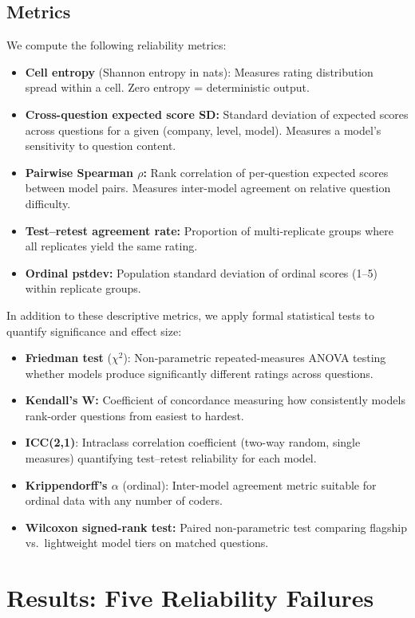 \documentclass{article}
\begin{document}
\subsection{Metrics}
We compute the following reliability metrics:
\begin{itemize}
  \item \textbf{Cell entropy} (Shannon entropy in nats): Measures rating distribution spread within a cell. Zero entropy = deterministic output.
  \item \textbf{Cross-question expected score SD:} Standard deviation of expected scores across questions for a given (company, level, model). Measures a model's sensitivity to question content.
  \item \textbf{Pairwise Spearman $\rho$:} Rank correlation of per-question expected scores between model pairs. Measures inter-model agreement on relative question difficulty.
  \item \textbf{Test--retest agreement rate:} Proportion of multi-replicate groups where all replicates yield the same rating.
  \item \textbf{Ordinal pstdev:} Population standard deviation of ordinal scores (1--5) within replicate groups.
\end{itemize}

In addition to these descriptive metrics, we apply formal statistical tests to quantify significance and effect size:
\begin{itemize}
  \item \textbf{Friedman test} ($\chi^2$): Non-parametric repeated-measures ANOVA testing whether models produce significantly different ratings across questions.
  \item \textbf{Kendall's W:} Coefficient of concordance measuring how consistently models rank-order questions from easiest to hardest.
  \item \textbf{ICC(2,1)}: Intraclass correlation coefficient (two-way random, single measures) quantifying test--retest reliability for each model.
  \item \textbf{Krippendorff's $\alpha$} (ordinal): Inter-model agreement metric suitable for ordinal data with any number of coders.
  \item \textbf{Wilcoxon signed-rank test:} Paired non-parametric test comparing flagship vs.\ lightweight model tiers on matched questions.
\end{itemize}

\section{Results: Five Reliability Failures}\label{sec:results}
\end{document}

